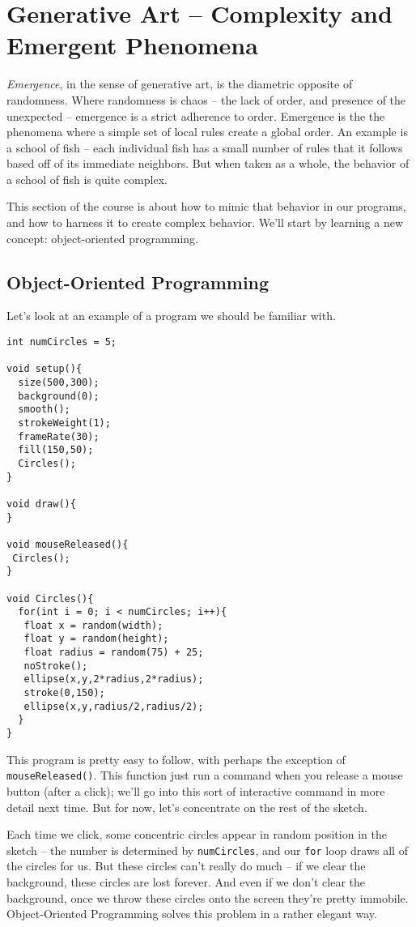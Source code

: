 \section{Generative Art -- Complexity and Emergent Phenomena}
\emph{Emergence}, in the sense of generative art, is the diametric opposite of randomness.  Where randomness is chaos -- the lack of order, and presence of the unexpected -- emergence is a strict adherence to order.  Emergence is the the phenomena where a simple set of local rules create a global order.  An example is a school of fish -- each individual fish has a small number of rules that it follows based off of its immediate neighbors.  But when taken as a whole, the behavior of a school of fish is quite complex.

This section of the course is about how to mimic that behavior in our programs, and how to harness it to create complex behavior.  We'll start by learning a new concept: object-oriented programming.

\subsection{Object-Oriented Programming}
Let's look at an example of a program we should be familiar with.

\begin{verbatim}
int numCircles = 5;

void setup(){
  size(500,300);
  background(0);
  smooth();
  strokeWeight(1);
  frameRate(30);
  fill(150,50);
  Circles();
}

void draw(){
}

void mouseReleased(){
 Circles(); 
}

void Circles(){
  for(int i = 0; i < numCircles; i++){
   float x = random(width);
   float y = random(height);
   float radius = random(75) + 25;
   noStroke();
   ellipse(x,y,2*radius,2*radius);
   stroke(0,150);
   ellipse(x,y,radius/2,radius/2);
  }
}
\end{verbatim}

This program is pretty easy to follow, with perhaps the exception of \texttt{mouseReleased()}.  This function just run a command when you release a mouse button (after a click); we'll go into this sort of interactive command in more detail next time.  But for now, let's concentrate on the rest of the sketch.

Each time we click, some concentric circles appear in random position in the sketch -- the number is determined by \texttt{numCircles}, and our \texttt{for} loop draws all of the circles for us.  But these circles can't really do much -- if we clear the background, these circles are lost forever.  And even if we don't clear the background, once we throw these circles onto the screen they're pretty immobile.  Object-Oriented Programming solves this problem in a rather elegant way.

